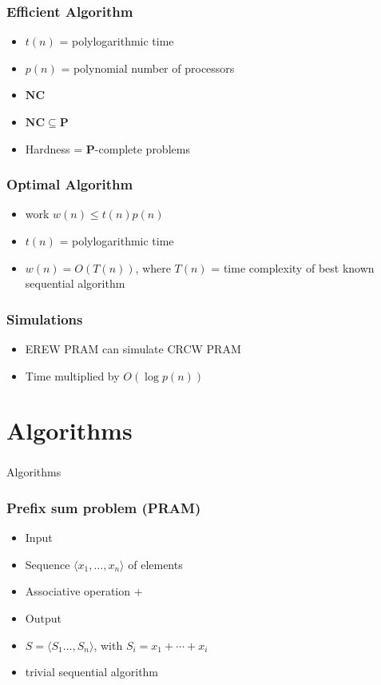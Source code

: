 \documentclass[12pt,aspectratio=169]{beamer}
\begin{document}
\begin{frame}\frametitle{Efficient Algorithm}
\begin{itemize}
\item
  $t(n)$ = polylogarithmic time
\item
  $p(n)$ = polynomial number of processors
\item
  $\mathbf{NC}$
\item
  $\mathbf{NC}\subseteq \mathbf{P}$
\item
  Hardness = $\mathbf{P}$-complete problems
\end{itemize}
\end{frame}


\begin{frame}\frametitle{Optimal Algorithm}
\begin{itemize}
\item
  \alert{work} $w(n) \le t(n) p(n)$
\item
  $t(n)$ = polylogarithmic time
\item
  $w(n) = O(T(n))$, where $T(n)$ = time complexity of \alert{best known}
  sequential algorithm
\end{itemize}
\end{frame}


\begin{frame}\frametitle{Simulations}
\begin{itemize}
\item
  EREW PRAM can simulate CRCW PRAM
\item
  Time multiplied by $O(\log p(n))$
\end{itemize}
\end{frame}




\section{Algorithms}


\begin{frame}\frametitle{}
  \begin{center}
    \Huge
    Algorithms
  \end{center}
\end{frame}

\begin{frame}\frametitle{Prefix sum problem (PRAM)}
  \begin{itemize}
  \item
    Input
  \item
    Sequence $\langle x_{1}, \ldots , x_{n} \rangle$ of elements
  \item
    Associative operation $+$
  \item
    Output
  \item
     $S=\langle S_{1}  \ldots , S_{n} \rangle$, with $S_{i} = x_{1} +
     \cdots + x_{i}$
   \item
     trivial sequential algorithm
  \end{itemize}
\end{frame}
\end{document}
